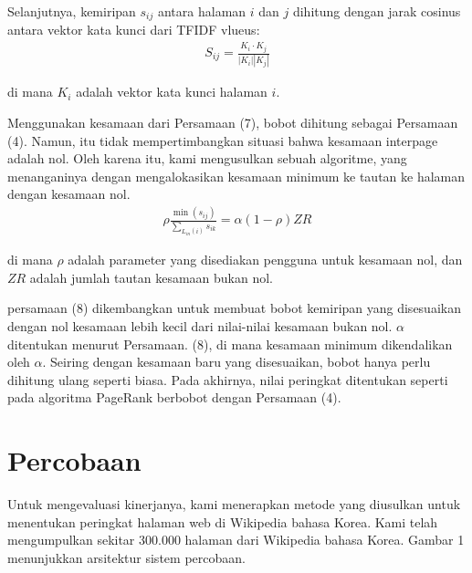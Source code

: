 \documentclass[conference]{IEEEtran}
\begin{document}
Selanjutnya, kemiripan $s_{ij}$ antara halaman $i$ dan $j$ dihitung dengan jarak cosinus antara vektor kata kunci dari TFIDF vlueus:
\begin{eqnarray}
    S_{i j}=\frac{K_{i} \cdot K_{j}}{\left|K_{i}\right|\left|K_{j}\right|}
\end{eqnarray}

di mana $K_{i}$ adalah vektor kata kunci halaman $i$.

Menggunakan kesamaan dari Persamaan (7), bobot dihitung sebagai Persamaan (4). Namun, itu tidak mempertimbangkan situasi bahwa kesamaan interpage adalah nol. Oleh karena itu, kami mengusulkan sebuah algoritme, yang menanganinya dengan mengalokasikan kesamaan minimum ke tautan ke halaman dengan kesamaan nol.
\begin{eqnarray}
    \rho \frac{\min \left(s_{i j}\right)}{\sum_{L_{i n}(i)} s_{i k}}=\alpha(1-\rho) Z R
\end{eqnarray}

di mana $\rho$ adalah parameter yang disediakan pengguna untuk kesamaan nol, dan $ZR$ adalah jumlah tautan kesamaan bukan nol.

persamaan (8) dikembangkan untuk membuat bobot kemiripan yang disesuaikan dengan nol kesamaan lebih kecil dari nilai-nilai kesamaan bukan nol. $\alpha$ ditentukan menurut Persamaan. (8), di mana kesamaan minimum dikendalikan oleh $\alpha$.
Seiring dengan kesamaan baru yang disesuaikan, bobot hanya perlu dihitung ulang seperti biasa. Pada akhirnya, nilai peringkat ditentukan seperti pada algoritma PageRank berbobot dengan Persamaan (4).

\section{Percobaan}

Untuk mengevaluasi kinerjanya, kami menerapkan metode yang diusulkan untuk menentukan peringkat halaman web di Wikipedia bahasa Korea. Kami telah mengumpulkan sekitar 300.000 halaman dari Wikipedia bahasa Korea. Gambar 1 menunjukkan arsitektur sistem percobaan.
\end{document}
